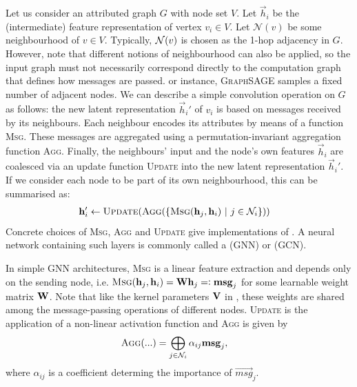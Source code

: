 \documentclass[
	fontsize=10pt, %
	twoside=false, %
	secnumdepth=1, %
  toc=indentunnumbered %
]{kaobook}
\begin{document}
Let us consider an attributed graph
$G$ with node set $V$.
Let $\vec h_i$ be the (intermediate) feature representation of vertex $v_i \in
V$. Let $\mathcal{N}(v)$ be some neighbourhood of $v \in V$. Typically,
$\neighb(v)$ is chosen as the 1-hop adjacency in $G$. However, note that
different notions of neighbourhood can also be applied, so the input graph must
not necessarily correspond directly to the computation graph that defines how
messages are passed. or instance, \textsc{GraphSAGE}
\cite{hamilton_InductiveRepresentationLearning_2018} samples a fixed number of
adjacent nodes. We can describe a simple convolution operation on $G$ as
follows: the new latent representation $\vec h_i'$ of $v_i$ is based on messages
received by its neighbours. Each neighbour encodes its attributes by means of a
function \textsc{Msg}. These messages are aggregated using a
permutation-invariant aggregation function \textsc{Agg}.
Finally, the neighbours' input and the node's own features $\vec h_i$ are
coalesced via an update function \textsc{Update} into the new latent
representation $\vec h_i'$. If we consider each node to be part of its own
neighbourhood, this can be summarised as:
\begin{align}
  & \vec h_i' \gets \textsc{Update}(\textsc{Agg}(\{\textsc{Msg}(\vec h_j, \vec h_i) ~|~ j \in \mathcal{N}_i\}))
    \label{eq:gnn-framework}
\end{align}
Concrete choices of \textsc{Msg}, \textsc{Agg} and \textsc{Update} give
implementations of . A neural network containing
such layers is commonly called a  (GNN)
or  (GCN).

In simple GNN architectures, \textsc{Msg} is a linear feature extraction and depends
only on the sending node, i.e. $\textsc{Msg}(\vec h_j, \vec h_i) = 
\mat W \vec h_j =: \msg_j$ for some learnable weight matrix $\mat W$. Note that
like the kernel parameters $\mat V$ in , these weights are
shared among the message-passing operations of different nodes.
% 
\textsc{Update} is the application of a non-linear activation function and
\textsc{Agg} is given by
\begin{align*}
  & \textsc{Agg}(...) = \bigoplus_{j \in \mathcal{N}_i} \alpha_{ij} \vec{msg}_j,
\end{align*} where $\alpha_{ij}$ is a coefficient determing the importance of
$\vec{msg}_{j}$.
\end{document}
